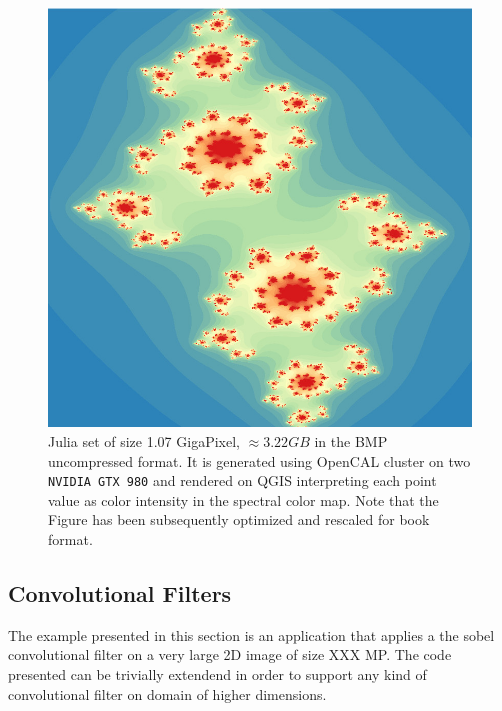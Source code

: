 { \begin{figure}[H]
	\begin{center}
		\includegraphics[scale=0.35]{./images/opencal/fractal16k16k}
		\caption{Julia set of size 1.07 GigaPixel, $\approx 3.22 GB$ in the BMP uncompressed format. It is generated using OpenCAL cluster on two \texttt{NVIDIA GTX 980} and rendered on QGIS \cite{QGIS_software} interpreting each point value as color intensity in the spectral color map. Note that the Figure has been subsequently optimized and rescaled for book format.}
		\label{fig:fractal16k16k}
	\end{center}
\end{figure}

\subsection{Convolutional Filters}
The example presented in this section is an application that applies a the sobel convolutional filter on a very large 2D image of size XXX MP. The code presented can be trivially extendend in order to support any kind of convolutional filter on domain of higher dimensions.

}
